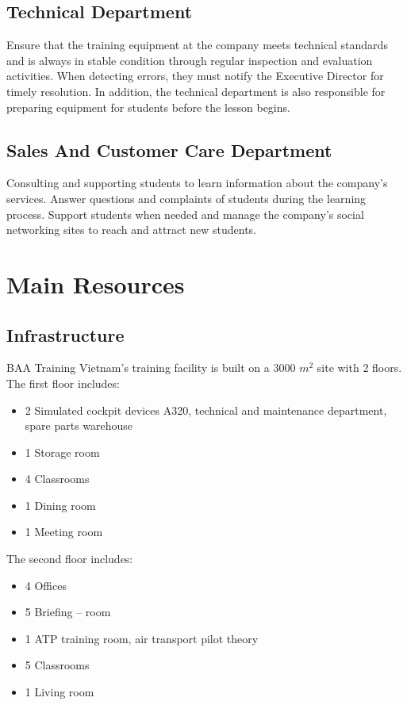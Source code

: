     \subsection{Technical Department}
        Ensure that the training equipment at the company meets technical standards and is always in stable condition through regular inspection and 
        evaluation activities. When detecting errors, they must notify the Executive Director for timely resolution. In addition, the technical department 
        is also responsible for preparing equipment for students before the lesson begins.
    \subsection{Sales And Customer Care Department}
        Consulting and supporting students to learn information about the company's services. Answer questions and complaints of students during the learning 
        process. Support students when needed and manage the company's social networking sites to reach and attract new students.

\section{Main Resources}
    \subsection{Infrastructure}
        BAA Training Vietnam's training facility is built on a 3000 $m^2$ site with 2 floors. \\ 
        \vspace{3mm}
        The first floor includes:
        \begin{itemize}
            \item 2 Simulated cockpit devices A320, technical and maintenance department, spare parts warehouse
            \item 1 Storage room
            \item 4 Classrooms
            \item 1 Dining room
            \item 1 Meeting room
        \end{itemize}
        The second floor includes:
        \begin{itemize}
            \item 4 Offices 
            \item 5 Briefing – room
            \item 1 ATP training room, air transport pilot theory 
            \item 5 Classrooms
            \item 1 Living room
        \end{itemize}
